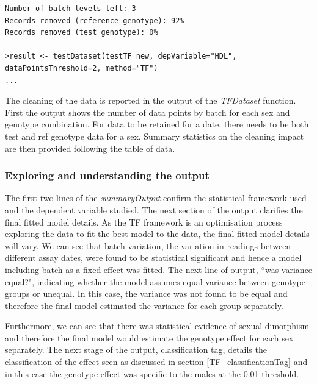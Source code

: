 \documentclass[12pt,a4paper]{article}
\begin{document}
\begin{verbatim}
Number of batch levels left: 3
Records removed (reference genotype): 92%
Records removed (test genotype): 0%

>result <- testDataset(testTF_new, depVariable="HDL", dataPointsThreshold=2, method="TF") 
...
\end{verbatim}
\endgroup 

The cleaning of the data is reported in the output of the \textit{TFDataset} function.  First the output shows the number of data points by batch for each sex and genotype combination.  For data to be retained for a date, there needs to be both test and ref genotype data for a sex. Summary statistics on the cleaning impact are then provided following the table of data.  

\subsubsection{Exploring and understanding the output}
The first two lines of the \textit{summaryOutput} confirm the statistical framework used and the dependent variable studied. The next section of the output clarifies the final fitted model details. As the TF framework is an optimisation process exploring the data to fit the best model to the data, the final fitted model details will vary. We can see that batch variation, the variation in readings between different assay dates, were found to be statistical significant and hence a model including batch as a fixed effect was fitted.  The next line of output, “was variance equal?", indicating whether the model assumes equal variance between genotype groups or unequal. In this case, the variance was not found to be equal and therefore the final model estimated the variance for each group separately.

Furthermore, we can see that there was statistical evidence of sexual dimorphism and therefore the final model would estimate the genotype effect for each sex separately. The next stage of the output, classification tag, details the classification of the effect seen as discussed in section \ref{TF_classificationTag} and in this case the genotype effect was specific to the males at the 0.01 threshold. 
\end{document}
